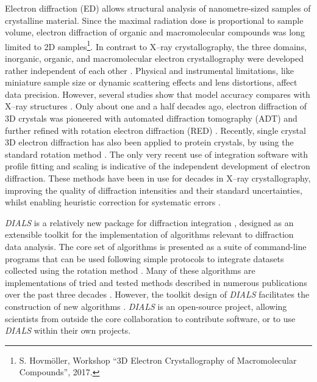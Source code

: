 \documentclass[preprint]{iucr}
\newcommand{\dials}{\emph{DIALS}\xspace}
\begin{document}
Electron diffraction (ED) allows structural analysis of nanometre-sized samples of
crystalline material. Since the maximal radiation dose is proportional to
sample volume, electron diffraction of organic and macromolecular compounds was
long limited to 2D samples\footnote{S. Hovm{\"o}ller, Workshop ``3D Electron
Crystallography of Macromolecular Compounds'', 2017.}\cite{unwin-henderson:1975}.
In contrast to X--ray crystallography, the three domains, inorganic, organic,
and macromolecular electron crystallography were developed rather independent
of each other
\cite{vainshtein:1964,dorset:1995,adt:2007,glaeser_downing_derosier:2007,zou:2011}.
Physical and instrumental limitations, like miniature sample size or dynamic
scattering effects and lens distortions, affect data precision. However,
several studies show that model accuracy compares with X--ray structures
\cite{weirich:1996,zeo_adt:2014,dorset:1992,palatinus:2017}. Only about one and
a half decades ago, electron diffraction of 3D crystals was pioneered with
automated diffraction tomography (ADT) and further refined with rotation electron
diffraction (RED) \cite{adt:2007,rotmethod_e:2010,gemmi_adt:2015}. Recently,
single crystal 3D electron diffraction has also been applied to protein
crystals, by using the standard rotation method
\cite{Arndt1977,Nederlof2013,Hattne2015,Yonekura2015,Clabbers2017}. The only
very recent use of integration software with profile fitting and scaling is
indicative of the
independent development of electron diffraction. These methods have been in use
for decades in X--ray crystallography, improving the quality of diffraction
intensities and their standard uncertainties, whilst enabling heuristic
correction for systematic errors \cite{pflugrath:1999,leslie1999integration}.

\dials is a relatively new package for diffraction integration
\cite{Winter2018}, designed as an extensible toolkit for the implementation of
algorithms relevant to diffraction data analysis. The core set of algorithms
is presented as a suite of command-line programs that can be used following
simple protocols to integrate datasets collected using the rotation method
\cite{Arndt1977}. Many of these algorithms are implementations of tried and
tested methods described in numerous publications over the past three decades
\cite{leslie1999integration,LURE1986phase1and2,LURE1986phase3,kabsch2010xds}.
However, the toolkit design of \dials facilitates the construction of new
algorithms \cite{Gildea2014,Parkhurst2016,Parkhurst2017}. \dials is an
open-source project, allowing scientists from outside the core collaboration to
contribute software, or to use \dials within their own projects.
\end{document}
